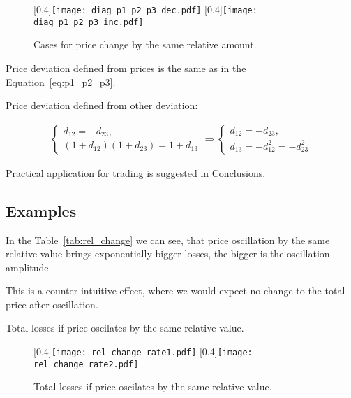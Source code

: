 \documentclass[a4paper]{article}
\begin{document}
\begin{figure}[H]  %
\centering
\hfill  %
  [0.4\textwidth]{\texttt{[image: diag\_p1\_p2\_p3\_dec.pdf]}}
\hfill
{}
  [0.4\textwidth]{\texttt{[image: diag\_p1\_p2\_p3\_inc.pdf]}}
\hfill
\caption{Cases for price change by the same relative amount.}
\label{fig:diag_p1_p2_p3}
\end{figure}

Price deviation defined from prices is the same as in
the Equation~\ref{eq:p1_p2_p3}.

Price deviation defined from other deviation:

\begin{align}
  \begin{cases}
  d_{12} = -d_{23},\\
  (1 + d_{12})(1 + d_{23}) = 1 + d_{13}
  \end{cases}
  \Rightarrow
  \begin{cases}
    d_{12} = -d_{23},\\
    \boxed{d_{13} = -d_{12}^2 = -d_{23}^2}
  \end{cases}
  \label{eq:p1_p2_p3_d13}
\end{align}

Practical application for trading is suggested in Conclusions.

\subsection*{Examples}

In the Table~\ref{tab:rel_change} we can see, that price oscillation by the
same relative value brings exponentially bigger losses, the bigger is the
oscillation amplitude.

This is a counter-intuitive effect, where we would expect no change to
the total price after oscillation.

\begin{table}[H]
  \centering
  \caption{Total losses if price oscilates by the same relative value.}
  \label{tab:rel_change}
\end{table}

\begin{figure}[H]  %
\centering
\hfill  %
  [0.4\textwidth]{\texttt{[image: rel\_change\_rate1.pdf]}}
\hfill
{}
  [0.4\textwidth]{\texttt{[image: rel\_change\_rate2.pdf]}}
\hfill
\caption{Total losses if price oscilates by the same relative value.}
\label{fig:rel_change}
\end{figure}
\end{document}
